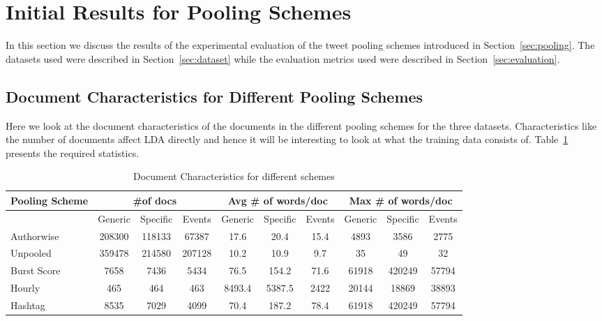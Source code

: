\documentclass[10pt,a5paper,twoside]{article}
\begin{document}
\section{Initial Results for Pooling Schemes}

In this section we discuss the results of the experimental evaluation
of the tweet pooling schemes introduced in
Section~\ref{sec:pooling}. The datasets used were described in
Section~\ref{sec:dataset} while the evaluation metrics used were
described in Section~\ref{sec:evaluation}.

\label{sec:init_results}

\subsection{Document Characteristics for Different Pooling Schemes}

Here we look at the document characteristics of the documents in the
different pooling schemes for the three datasets. Characteristics
like the number of documents affect LDA directly and hence it will be
interesting to look at what the training data consists
of. Table~\ref{tbl-3} presents the required statistics.

\begin{table}[!h]
\centering
\resizebox{14cm}{!} 
{
	\begin{tabular}{|l|ccc|ccc|ccc|}
	\hline
	Pooling Scheme  & \multicolumn {3}{c|}{\#of docs} & \multicolumn {3}{c|}{Avg \# of words/doc} & \multicolumn {3}{c|}{Max \# of words/doc}\\
	\hline
	 & Generic & Specific & Events &  Generic & Specific & Events &  Generic & Specific & Events\\
	\hline
	Authorwise & 208300 & 118133 & 67387 & 17.6 & 20.4 & 15.4 & 4893 & 3586 & 2775 \\
	\hline
	Unpooled & 359478 & 214580 & 207128 & 10.2 & 10.9 & 9.7 & 35 & 49 & 32 \\
	\hline
	Burst Score & 7658 & 7436 & 5434 & 76.5 & 154.2 & 71.6 & 61918 & 420249 & 57794 \\
	\hline
	Hourly & 465 & 464 & 463 & 8493.4 & 5387.5 & 2422 & 20144 & 18869 & 38893 \\
	\hline
	Hashtag & 8535 & 7029 & 4099 & 70.4 & 187.2 & 78.4 & 61918 & 420249 & 57794 \\
	\hline
	\end{tabular}
}
\caption{Document Characteristics for different schemes}\label{tbl-3}
\end{table}
\end{document}

